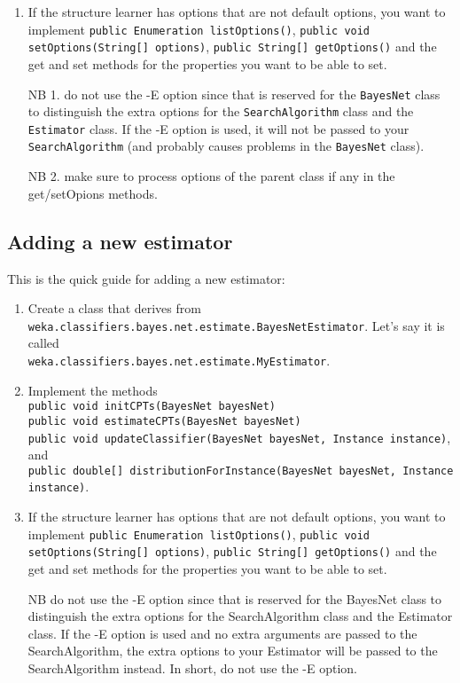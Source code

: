 \documentclass[a4paper]{article}
\begin{document}
\begin{enumerate}
\item If the structure learner has options that are not default options,
you want to implement {\tt public Enumeration listOptions()}, 
{\tt public void setOptions(String[] options)}, 
{\tt public String[] getOptions()} and the get and set methods for
the properties you want to be able to set.

NB 1. do not use the -E option since that is reserved for the {\tt BayesNet} class to 
distinguish the extra options for the {\tt SearchAlgorithm} class and the {\tt Estimator} class.
If the -E option is used, it will not be passed to your {\tt SearchAlgorithm} (and
probably causes problems in the {\tt BayesNet} class).

NB 2. make sure to process options of the parent class if any in the get/setOpions
methods.
\end{enumerate}

\subsection*{Adding a new estimator}

This is the quick guide for adding a new estimator:

\begin{enumerate}
\item Create a class that derives from \\
  {\tt weka.classifiers.bayes.net.estimate.BayesNetEstimator}.
  Let's say it is called \\
  {\tt weka.classifiers.bayes.net.estimate.MyEstimator}.

\item Implement the methods\\
{\tt public void initCPTs(BayesNet bayesNet)} \\
{\tt public void estimateCPTs(BayesNet bayesNet)} \\
{\tt public void updateClassifier(BayesNet bayesNet, Instance instance)}, and \\
{\tt  public double[] distributionForInstance(BayesNet bayesNet, Instance instance)}.

\item If the structure learner has options that are not default options,
you want to implement {\tt public Enumeration listOptions()},
{\tt public void setOptions(String[] options)},
{\tt public String[] getOptions()} and the get and set methods for
the properties you want to be able to set.

NB do not use the -E option since that is reserved for the BayesNet class to 
distinguish the extra options for the SearchAlgorithm class and the Estimator class.
If the -E option is used and no extra arguments are passed to the SearchAlgorithm,
the extra options to your Estimator will be passed to the SearchAlgorithm
instead. In short, do not use the -E option.
\end{enumerate}
\end{document}
